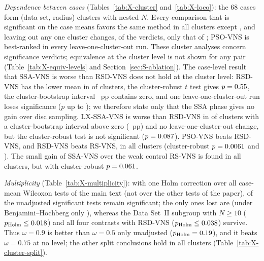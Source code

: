 \documentclass[10pt]{article}
\begin{document}
\emph{Dependence between cases} (Tables~\ref{tab:X-cluster} and~\ref{tab:X-loco}): the 68 cases form \NXClusters{} (data set, radius) clusters with nested $N$. Every comparison that is significant on the case means favors the same method in all \NXClusters{} clusters except \NXClCaseSigNotUnanimous{}, and leaving out any one cluster changes, of the \NXLocoNPairs{} verdicts, only that of \NXLocoChanged{}; PSO-VNS is best-ranked in every leave-one-cluster-out run. These cluster analyses concern significance verdicts; equivalence at the cluster level is not shown for any pair (Table~\ref{tab:X-equiv-levels} and Section~\ref{sec:S-ablation}). %
The case-level result that SSA-VNS is worse than RSD-VNS does not hold at the cluster level: RSD-VNS has the lower mean in \NXClSSAVNSvsRSDVNSOpp{} of \NXClustersNum{} clusters, the cluster-robust $t$ test gives $p=0.55$, the cluster-bootstrap interval \NXClSSAVNSvsRSDVNSCI~pp contains zero, and one leave-one-cluster-out run loses significance ($p$ up to \NXLocoSSAVNSvsRSDVNSPMax); we therefore state only that the SSA phase gives no gain over disc sampling. LX-SSA-VNS is worse than RSD-VNS in \NXClLXSSAVNSvsRSDVNSOpp{} of \NXClustersNum{} clusters with a cluster-bootstrap interval above zero (\NXClLXSSAVNSvsRSDVNSCI~pp) and no leave-one-cluster-out change, but the cluster-robust test is not significant ($p=0.087$). PSO-VNS beats RSD-VNS, and RSD-VNS beats RS-VNS, in all \NXClusters{} clusters (cluster-robust $p=0.0061$ and \NXClRSDVNSvsRSVNSCRP). The small gain of SSA-VNS over the weak control RS-VNS is found in all clusters, but with cluster-robust $p=0.061$. %

\emph{Multiplicity} (Table~\ref{tab:X-multiplicity}): with one Holm correction over all \NXMultN{} case-mean Wilcoxon tests of the main text (not over the other tests of the paper), \NXMultSigHolm{} of the \NXMultSigRaw{} unadjusted significant tests remain significant; the only ones lost are \NXMultLostHolm{} (under Benjamini--Hochberg only \NXMultLostBH), whereas the Data Set~II subgroup with $N\ge10$ ($p_{\rm Holm}\le0.018$) and all four contrasts with RSD-VNS ($p_{\rm Holm}\le0.038$) survive. Thus $\omega=0.9$ is better than $\omega=0.5$ only unadjusted ($p_{\rm Holm}=0.19$), and it beats $\omega=0.75$ at no level; the other split conclusions hold in all clusters (Table~\ref{tab:X-cluster-split}). %
\end{document}
